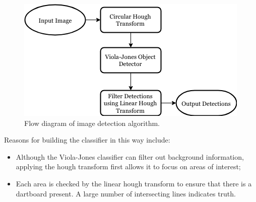 \documentclass[conference]{IEEEtran}
\begin{document}
\begin{figure}[htbp]
\begin{center}
\includegraphics[width=1\linewidth]{images/flowdiagram.png}
\caption{Flow diagram of image detection algorithm. }
\label{default}
\end{center}
\end{figure}
Reasons  for building the classifier in this way include: 
\begin{itemize}
\item Although the Viola-Jones classifier can filter out background information, applying the hough transform first allows it to focus on areas of interest; 
\item Each area is checked by the linear hough transform to ensure that there is a dartboard present. A large number of intersecting lines indicates truth. 
\end{itemize}
\end{document}
